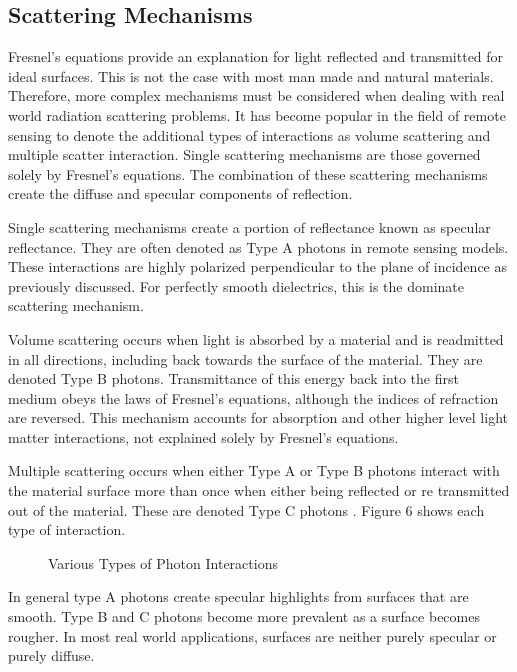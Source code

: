 \subsection{Scattering Mechanisms}

Fresnel’s equations provide an explanation for light reflected and transmitted for ideal surfaces.  This is not the case with most man made and natural materials.  Therefore, more complex mechanisms must be considered when dealing with real world radiation scattering problems.  It has become popular in the field of remote sensing to denote the additional types of interactions as volume scattering and multiple scatter interaction.  Single scattering mechanisms are those governed solely by Fresnel’s equations.  The combination of these scattering mechanisms create the diffuse and specular components of reflection.

Single scattering mechanisms create a portion of reflectance known as specular reflectance.  They are often denoted as Type A photons in remote sensing models.  These interactions are highly polarized perpendicular to the plane of incidence as previously discussed. For perfectly smooth dielectrics, this is the dominate scattering mechanism.

Volume scattering occurs when light is absorbed by a material and is readmitted in all directions, including back towards the surface of the material.  They are denoted Type B photons.  Transmittance of this energy back into the first medium obeys the laws of Fresnel’s equations, although the indices of refraction are reversed.  This mechanism accounts for absorption and other higher level light matter interactions, not explained solely by Fresnel’s equations.

Multiple scattering occurs when either Type A or Type B photons interact with the material surface more than once when either being reflected or re transmitted out of the material.  These are denoted Type C photons \cite{schott}.  Figure 6 shows each type of interaction.
%
\begin{figure}
    \begin{center}
    \end{center}
    \caption{Various Types of Photon Interactions}
    \label{fig:scattering}
\end{figure}
%
In general type A photons create specular highlights from surfaces that are smooth.  Type B and C photons become more prevalent as a surface becomes rougher.  In most real world applications, surfaces are neither purely specular or purely diffuse.

